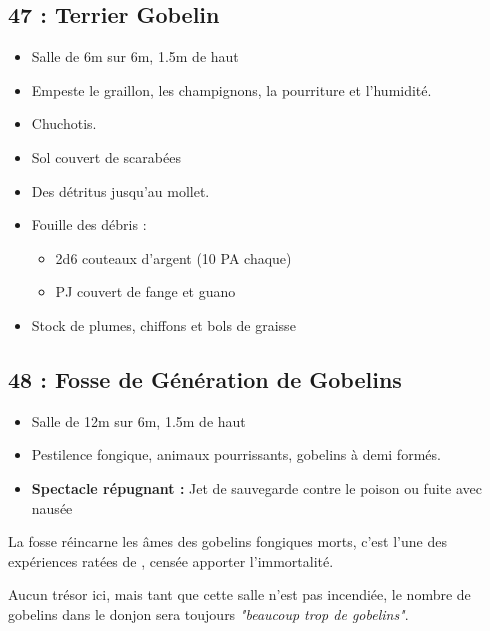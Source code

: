 \subsection{47 : Terrier Gobelin}\label{n3:s47}
\begin{itemize}
  \item Salle de 6m sur 6m, 1.5m de haut
  \item Empeste le graillon, les champignons, la pourriture et l'humidité.
  \item Chuchotis.
  \item Sol couvert de scarabées
  \item Des détritus jusqu'au mollet.
  \item Fouille des débris :
  \begin{itemize}
    \item 2d6 couteaux d'argent (10 PA chaque)
    \item PJ couvert de fange et guano
  \end{itemize}
  \item Stock de plumes, chiffons et bols de graisse
\end{itemize}

\subsection{48 : Fosse de Génération de Gobelins}\label{n3:s48}
\begin{itemize}
  \item Salle de 12m sur 6m, 1.5m de haut
  \item Pestilence fongique, animaux pourrissants, gobelins à demi formés.
  \item \textbf{Spectacle répugnant :} Jet de sauvegarde contre le poison ou fuite avec nausée
\end{itemize}

La fosse réincarne les âmes des gobelins fongiques morts, c'est l'une des expériences ratées de
\textbf{}, censée apporter l'immortalité.

Aucun trésor ici, mais tant que cette salle n'est pas incendiée, le nombre de gobelins dans le donjon sera toujours \emph{"beaucoup trop de gobelins"}.

\vfill

